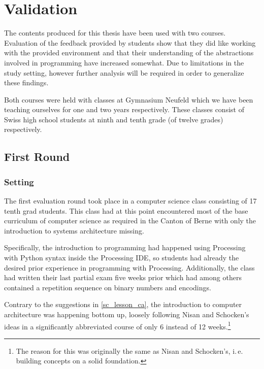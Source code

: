 \chapter{Validation} \label{ch_practice}

The contents produced for this thesis have been used with two courses. Evaluation of the feedback provided by students show that they did like working with the provided environment and that their understanding of the abstractions involved in programming have increased somewhat. Due to limitations in the study setting, however further analysis will be required in order to generalize these findings.

Both courses were held with classes at Gymnasium Neufeld which we have been teaching ourselves for one and two years respectively. These classes consist of Swiss high school students at ninth and tenth grade (of twelve grades) respectively.


\section{First Round} \label{sc_validation_ca} %

\subsection{Setting}

The first evaluation round took place in a computer science class consisting of 17 tenth grad students. This class had at this point encountered most of the base curriculum of computer science as required in the Canton of Berne \cite[p.\,145--146]{Erz16} with only the introduction to systems architecture missing.

Specifically, the introduction to programming had happened using Processing with Python syntax inside the Processing IDE, so students had already the desired prior experience in programming with Processing. Additionally, the class had written their last partial exam five weeks prior which had among others contained a repetition sequence on binary numbers and encodings.

Contrary to the suggestions in \ref{sc_lesson_ca}, the introduction to computer architecture was happening bottom up, loosely following Nisan and Schocken's ideas \cite{Nis21} in a significantly abbreviated course of only 6 instead of 12 weeks.\footnote{The reason for this was originally the same as Nisan and Schocken's, i.\,e. building concepts on a solid foundation.}

